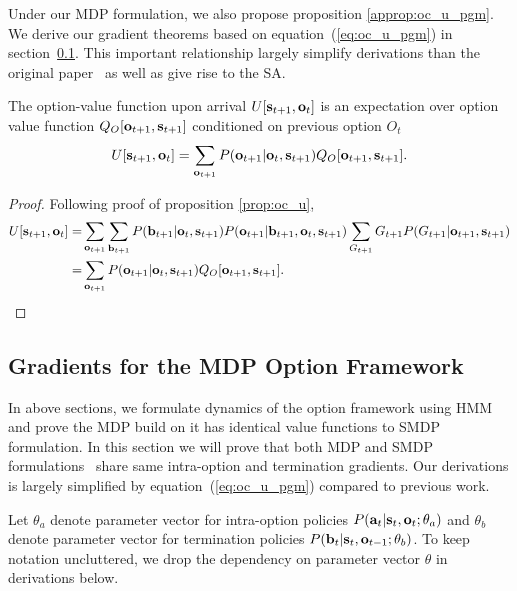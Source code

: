 Under our MDP formulation, we also propose proposition
\ref{approp:oc_u_pgm}. We derive our gradient theorems based on
equation~(\ref{eq:oc_u_pgm}) in section~\ref{sec:appen_mdp_grad}.
This important relationship largely simplify derivations than the
original paper~\cite{bacon2017option} as well as give rise to the
SA.

\begin{prop}
    \label{approp:oc_u_pgm}
    The option-value function upon arrival $U[{\mathbf{s}}_{t+1},{\mathbf{o}}_t]$
    is an expectation over option value function
    $Q_O[{\mathbf{o}}_{t+1},{\mathbf{s}}_{t+1}]$ conditioned on previous option
    $O_{t}$
  \begin{equation}
    \label{eq:oc_u_pgm}
    U[{\mathbf{s}}_{t+1},{\mathbf{o}}_t]= \sum_{{\mathbf{o}}_{t+1}}P({\mathbf{o}}_{t+1}|{\mathbf{o}}_t,{\mathbf{s}}_{t+1})Q_O[{\mathbf{o}}_{t+1},{\mathbf{s}}_{t+1}].
  \end{equation}
\end{prop}

\begin{proof}
  Following proof of proposition \ref{prop:oc_u},
 \begin{align*}
  \nonumber U[{\mathbf{s}}_{t+1},{\mathbf{o}}_t]=&\sum_{{\mathbf{o}}_{t+1}}\sum_{{\mathbf{b}}_{t+1}}P({\mathbf{b}}_{t+1}|{\mathbf{o}}_t,{\mathbf{s}}_{t+1})P({\mathbf{o}}_{t+1}|{\mathbf{b}}_{t+1},{\mathbf{o}}_t,{\mathbf{s}}_{t+1})\sum_{G_{t+1}}G_{t+1}P(G_{t+1}|{\mathbf{o}}_{t+1},{\mathbf{s}}_{t+1})\\
=&\sum_{{\mathbf{o}}_{t+1}}P({\mathbf{o}}_{t+1}|{\mathbf{o}}_t,{\mathbf{s}}_{t+1})Q_O[{\mathbf{o}}_{t+1},{\mathbf{s}}_{t+1}].
\end{align*}
\end{proof}

\subsection{Gradients for the MDP Option Framework}
\label{sec:appen_mdp_grad}

In above sections, we formulate dynamics of the option framework
using HMM and prove the MDP build on it has identical value
functions to SMDP formulation. In this section we will prove that
both MDP and SMDP formulations~\cite{bacon2017option} share same
intra-option and termination gradients. Our derivations is
largely simplified by equation~(\ref{eq:oc_u_pgm}) compared to
previous work.

Let $\theta_a$ denote parameter vector for intra-option policies
$P({\mathbf{a}}_t|{\mathbf{s}}_t,{\mathbf{o}}_t;\theta_a)$ and $\theta_b$ denote
parameter vector for termination policies
$P({\mathbf{b}}_t|{\mathbf{s}}_t,{\mathbf{o}}_{t-1};\theta_b)$. To keep notation
uncluttered, we drop the dependency on parameter vector $\theta$
in derivations below.

